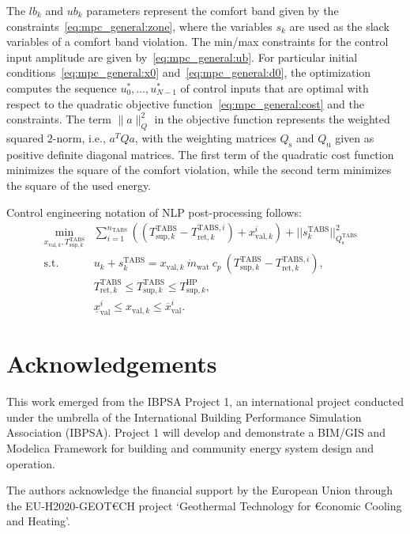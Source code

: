 \documentclass[10pt]{extarticle}
\newcommand{\lrp}[1]{\ensuremath{\left( #1 \right)}}
\begin{document}
The $lb_k$ and $ub_k$ parameters represent the comfort band 
given by the constraints~\eqref{eq:mpc_general:zone},
where the variables $s_k$ are used as the slack variables of a comfort band violation.
The min/max constraints for the control input amplitude are given by~\eqref{eq:mpc_general:ub}.
For particular initial conditions~\eqref{eq:mpc_general:x0} and~\eqref{eq:mpc_general:d0}, 
 the optimization computes the sequence $u_0^*, \ldots, u_{N-1}^*$ of control inputs that
are optimal with respect to the quadratic objective function~\eqref{eq:mpc_general:cost}
and the constraints.
The term $\|a\|_Q^2$ in the objective function represents the weighted squared $2$-norm, i.e., $a^T Q a$,
with the weighting matrices $Q_\text{s}$ and $Q_\text{u}$ given as positive 
definite diagonal matrices.
The first term of the quadratic cost function minimizes the square of the comfort violation,
while the second term minimizes the square of the used energy.
% 

Control engineering notation of NLP post-processing follows:
\begin{subequations}
\label{eq:NLP_postprocess}
\begin{align}
 \min_{x_{\text{val},k}, T_{\text{sup},k}^{\text{TABS}}} & \sum_{i=1}^{n_{\text{TABS}}} \lrp{(T_{\text{sup},k}^{\text{TABS}} - T_{\text{ret},k}^{\text{TABS},i}) + x_{\text{val},k}^i } + || s_{k}^{\text{TABS}} ||_{Q^{\text{TABS}}_{\text{s}}}^2  &
 \label{eq:NLP_postprocess:cost}\\
  \text{s.t.} \ & u_k + s_{k}^{\text{TABS}} = x_{\text{val},k} \ \dot{m}_{\text{wat}} \ c_p \ (T_{\text{sup},k}^{\text{TABS}} -  T_{\text{ret},k}^{\text{TABS},i}), &  \label{eq:NLP_postprocess:heat_equation} \\
   &  T_{\text{ret},k}^{\text{TABS}} \le T_{\text{sup},k}^{\text{TABS}} \le T_{\text{sup},k}^{\text{HP}}, \label{eq:NLP_postprocess:tsup_minmax}\\
     & \underline{x}^i_{\text{val}} \le x_{\text{val},k} \le \overline{ x}^i_{\text{val}}.   \label{eq:NLP_postprocess:valve_minmax}
\end{align}
\end{subequations}




\section*{Acknowledgements}

This work emerged from the IBPSA Project 1, an international project conducted under the umbrella of the International Building Performance Simulation Association (IBPSA). Project 1 will develop and demonstrate a BIM/GIS and Modelica Framework for building and community energy system design and operation.

The authors acknowledge the financial support by the European Union through  the EU-H2020-GEOT\euro CH 
project ‘Geothermal Technology for \euro conomic Cooling and Heating’.
\end{document}
